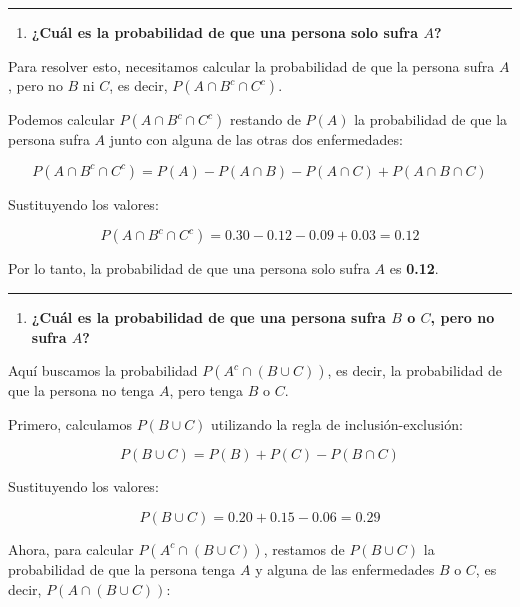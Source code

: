 \documentclass[
]{article}
\providecommand{\tightlist}{%
  \setlength{\itemsep}{0pt}\setlength{\parskip}{0pt}}
\begin{document}
\begin{center}\rule{0.5\linewidth}{0.5pt}\end{center}

\begin{enumerate}
\def\labelenumi{\alph{enumi})}
\setcounter{enumi}{1}
\tightlist
\item
  \textbf{¿Cuál es la probabilidad de que una persona solo sufra \(A\)?}
\end{enumerate}

Para resolver esto, necesitamos calcular la probabilidad de que la persona sufra \(A\), pero no \(B\) ni \(C\), es decir, \(P(A \cap B^c \cap C^c)\).

Podemos calcular \(P(A \cap B^c \cap C^c)\) restando de \(P(A)\) la probabilidad de que la persona sufra \(A\) junto con alguna de las otras dos enfermedades:

\[
P(A \cap B^c \cap C^c) = P(A) - P(A \cap B) - P(A \cap C) + P(A \cap B \cap C)
\]

Sustituyendo los valores:

\[
P(A \cap B^c \cap C^c) = 0.30 - 0.12 - 0.09 + 0.03 = 0.12
\]

Por lo tanto, la probabilidad de que una persona solo sufra \(A\) es \textbf{0.12}.

\begin{center}\rule{0.5\linewidth}{0.5pt}\end{center}

\begin{enumerate}
\def\labelenumi{\alph{enumi})}
\setcounter{enumi}{2}
\tightlist
\item
  \textbf{¿Cuál es la probabilidad de que una persona sufra \(B\) o \(C\), pero no sufra \(A\)?}
\end{enumerate}

Aquí buscamos la probabilidad \(P(A^c \cap (B \cup C))\), es decir, la probabilidad de que la persona no tenga \(A\), pero tenga \(B\) o \(C\).

Primero, calculamos \(P(B \cup C)\) utilizando la regla de inclusión-exclusión:

\[
P(B \cup C) = P(B) + P(C) - P(B \cap C)
\]

Sustituyendo los valores:

\[
P(B \cup C) = 0.20 + 0.15 - 0.06 = 0.29
\]

Ahora, para calcular \(P(A^c \cap (B \cup C))\), restamos de \(P(B \cup C)\) la probabilidad de que la persona tenga \(A\) y alguna de las enfermedades \(B\) o \(C\), es decir, \(P(A \cap (B \cup C))\):
\end{document}
